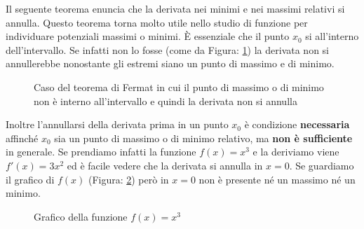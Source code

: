 Il seguente teorema enuncia che la derivata nei minimi e nei massimi relativi 
si annulla. Questo teorema torna molto utile nello studio di funzione per 
individuare potenziali massimi o minimi.
\thm {
Data una funzione $f: [a,b] \to \mathbb{R}$, un punto di massimo o di 
minimo $x_0 \in ]a,b[$, se inoltre $f$ è derivabile in $x_0$, allora:
\begin{equation*}
    f'(x_0) = 0
\end{equation*}
}
È essenziale che il punto $x_0$ si all'interno dell'intervallo. Se infatti non 
lo fosse (come da Figura: \ref{fig_fermat1}) la derivata non si annullerebbe 
nonostante gli estremi siano un punto di massimo e di minimo. 

\begin{figure}[h]
\centering
{}
  \caption{Caso del teorema di Fermat in cui il punto di massimo o di minimo 
    non è interno all'intervallo e quindi la derivata non si annulla} 
	\label{fig_fermat1}
\end{figure}



Inoltre l'annullarsi della derivata prima in un punto $x_0$ è condizione 
\textbf{necessaria} affinché $x_0$ sia un punto di massimo o di minimo 
relativo, ma \textbf{non è sufficiente} in generale. Se prendiamo infatti la 
funzione $f(x) = x^3$ e la deriviamo viene $f'(x) = 3x^2$ ed è facile vedere 
che la derivata si annulla in $x = 0$. Se guardiamo il grafico di $f(x)$ 
(Figura: \ref{fig_graficoXTree}) però in $x= 0$ non è presente né un massimo 
né un minimo.

\begin{figure}[h]
\centering
{}
	\caption{Grafico della funzione $f(x) = x^3$}
	\label{fig_graficoXTree}
\end{figure}
	

